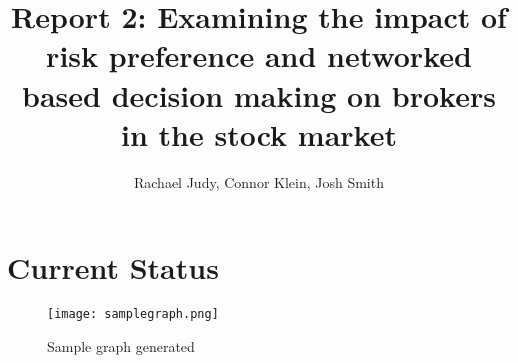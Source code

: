 \documentclass[letterpaper, 10 pt, proceedings]{ieeetran}  %
\title{\LARGE \bf
	Report 2: Examining the impact of risk preference and networked based decision making on brokers in the stock market
}
\author{Rachael Judy, Connor Klein, Josh Smith%
}
\begin{document}
	
	\maketitle
	\thispagestyle{empty}
	\pagestyle{empty}
	
	
	\section{Current Status}
	
	\begin{figure}
		\texttt{[image: samplegraph.png]}
		\caption{Sample graph generated}
		\label{samplegraph}
	\end{figure}
	
	
	
	
\end{document}
